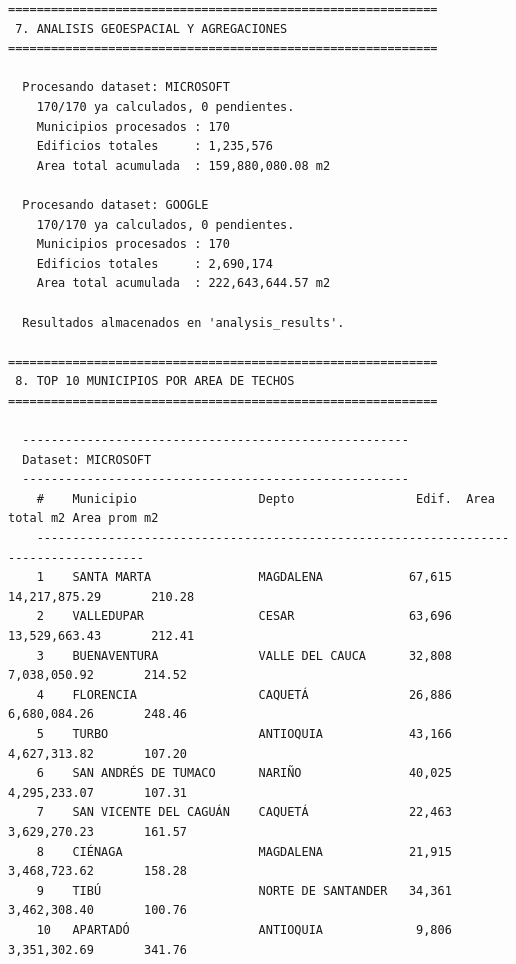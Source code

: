 \documentclass[12pt,a4paper]{article}
\begin{document}
\begin{lstlisting}[style=evidence]
============================================================
 7. ANALISIS GEOESPACIAL Y AGREGACIONES
============================================================

  Procesando dataset: MICROSOFT
    170/170 ya calculados, 0 pendientes.
    Municipios procesados : 170
    Edificios totales     : 1,235,576
    Area total acumulada  : 159,880,080.08 m2

  Procesando dataset: GOOGLE
    170/170 ya calculados, 0 pendientes.
    Municipios procesados : 170
    Edificios totales     : 2,690,174
    Area total acumulada  : 222,643,644.57 m2

  Resultados almacenados en 'analysis_results'.

============================================================
 8. TOP 10 MUNICIPIOS POR AREA DE TECHOS
============================================================

  ------------------------------------------------------
  Dataset: MICROSOFT
  ------------------------------------------------------
    #    Municipio                 Depto                 Edif.  Area total m2 Area prom m2
    -------------------------------------------------------------------------------------
    1    SANTA MARTA               MAGDALENA            67,615  14,217,875.29       210.28
    2    VALLEDUPAR                CESAR                63,696  13,529,663.43       212.41
    3    BUENAVENTURA              VALLE DEL CAUCA      32,808   7,038,050.92       214.52
    4    FLORENCIA                 CAQUETÁ              26,886   6,680,084.26       248.46
    5    TURBO                     ANTIOQUIA            43,166   4,627,313.82       107.20
    6    SAN ANDRÉS DE TUMACO      NARIÑO               40,025   4,295,233.07       107.31
    7    SAN VICENTE DEL CAGUÁN    CAQUETÁ              22,463   3,629,270.23       161.57
    8    CIÉNAGA                   MAGDALENA            21,915   3,468,723.62       158.28
    9    TIBÚ                      NORTE DE SANTANDER   34,361   3,462,308.40       100.76
    10   APARTADÓ                  ANTIOQUIA             9,806   3,351,302.69       341.76


\end{lstlisting}
\end{document}
